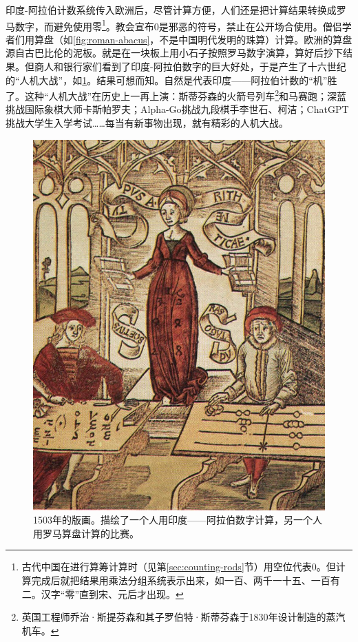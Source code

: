 \documentclass[b5paper]{ctexart}
\begin{document}
印度-阿拉伯计数系统传入欧洲后，尽管计算方便，人们还是把计算结果转换成罗马数字，而避免使用零\footnote{古代中国在进行算筹计算时（见第\ref{sec:counting-rods}节）用空位代表0。但计算完成后就把结果用乘法分组系统表示出来，如一百、两千一十五、一百有二。汉字“零”直到宋、元后才出现。}。教会宣布0是邪恶的符号，禁止在公开场合使用。僧侣学者们用算盘（如\cref{fig:roman-abacus}，不是中国明代发明的珠算）计算。欧洲的算盘源自古巴比伦的泥板。就是在一块板上用小石子按照罗马数字演算，算好后抄下结果。但商人和银行家们看到了印度-阿拉伯数字的巨大好处，于是产生了十六世纪的“人机大战”，如\cref{fig:hindu-arabic-vs-abacus}。结果可想而知。自然是代表印度——阿拉伯计数的“机”胜了。这种“人机大战”在历史上一再上演：斯蒂芬森的火箭号列车\footnote{英国工程师乔治·斯提芬森和其子罗伯特·斯蒂芬森于1830年设计制造的蒸汽机车。}和马赛跑；深蓝挑战国际象棋大师卡斯帕罗夫；Alpha-Go挑战九段棋手李世石、柯洁；ChatGPT挑战大学生入学考试……每当有新事物出现，就有精彩的人机大战。

\begin{figure}[htbp]
 \centering
 \includegraphics[scale=0.8]{img/Hindu-arabic-vs-abacus}
 \caption{1503年的版画。描绘了一个人用印度——阿拉伯数字计算，另一个人用罗马算盘计算的比赛。}
 \label{fig:hindu-arabic-vs-abacus}
\end{figure}
\end{document}
